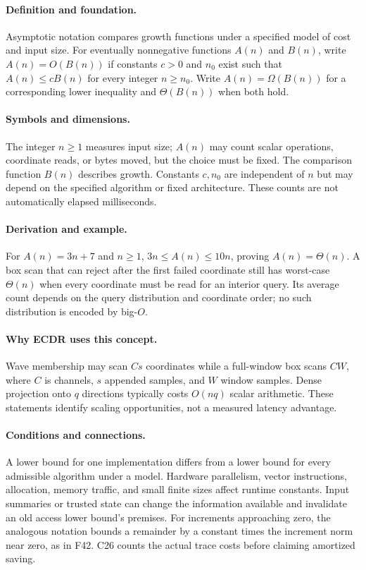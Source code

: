 \paragraph{Definition and foundation.}
Asymptotic notation compares growth functions under a specified model of cost and input size. For eventually nonnegative functions $A(n)$ and $B(n)$, write $A(n)=O(B(n))$ if constants $c>0$ and $n_0$ exist such that $A(n)\le cB(n)$ for every integer $n\ge n_0$. Write $A(n)=\Omega(B(n))$ for a corresponding lower inequality and $\Theta(B(n))$ when both hold.
\paragraph{Symbols and dimensions.}
The integer $n\ge1$ measures input size; $A(n)$ may count scalar operations, coordinate reads, or bytes moved, but the choice must be fixed. The comparison function $B(n)$ describes growth. Constants $c,n_0$ are independent of $n$ but may depend on the specified algorithm or fixed architecture. These counts are not automatically elapsed milliseconds.
\paragraph{Derivation and example.}
For $A(n)=3n+7$ and $n\ge1$, $3n\le A(n)\le10n$, proving $A(n)=\Theta(n)$. A box scan that can reject after the first failed coordinate still has worst-case $\Theta(n)$ when every coordinate must be read for an interior query. Its average count depends on the query distribution and coordinate order; no such distribution is encoded by big-$O$.
\paragraph{Why ECDR uses this concept.}
Wave membership may scan $Cs$ coordinates while a full-window box scans $CW$, where $C$ is channels, $s$ appended samples, and $W$ window samples. Dense projection onto $q$ directions typically costs $O(nq)$ scalar arithmetic. These statements identify scaling opportunities, not a measured latency advantage.
\paragraph{Conditions and connections.}
A lower bound for one implementation differs from a lower bound for every admissible algorithm under a model. Hardware parallelism, vector instructions, allocation, memory traffic, and small finite sizes affect runtime constants. Input summaries or trusted state can change the information available and invalidate an old access lower bound's premises. For increments approaching zero, the analogous notation bounds a remainder by a constant times the increment norm near zero, as in F42. C26 counts the actual trace costs before claiming amortized saving.

